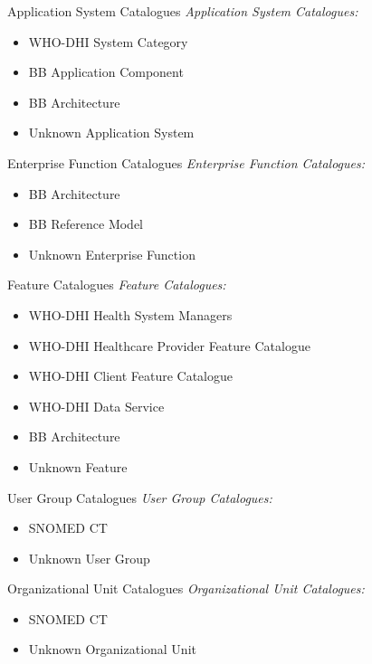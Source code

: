 \documentclass[aspectratio=1610,12pt]{beamer}
\begin{document}
\begin{frame}{Application System Catalogues}
  \emph{Application System Catalogues:}
  \begin{itemize}
    \item WHO-DHI System Category
    \item BB Application Component
    \item BB Architecture
    \item Unknown Application System
  \end{itemize}
\end{frame}

\begin{frame}{Enterprise Function Catalogues}
  \emph{Enterprise Function Catalogues:}
  \begin{itemize}
    \item BB Architecture
    \item BB Reference Model
    \item Unknown Enterprise Function
  \end{itemize}
\end{frame}

\begin{frame}{Feature Catalogues}
  \emph{Feature Catalogues:}
  \begin{itemize}
    \item WHO-DHI Health System Managers
    \item WHO-DHI Healthcare Provider Feature Catalogue
    \item WHO-DHI Client Feature Catalogue
    \item WHO-DHI Data Service
    \item BB Architecture
    \item Unknown Feature
  \end{itemize}
\end{frame}

\begin{frame}{User Group Catalogues}
  \emph{User Group Catalogues:}
  \begin{itemize}
    \item SNOMED CT
    \item Unknown User Group
  \end{itemize}
\end{frame}

\begin{frame}{Organizational Unit Catalogues}
  \emph{Organizational Unit Catalogues:}
  \begin{itemize}
    \item SNOMED CT
    \item Unknown Organizational Unit
  \end{itemize}
\end{frame}
\end{document}
